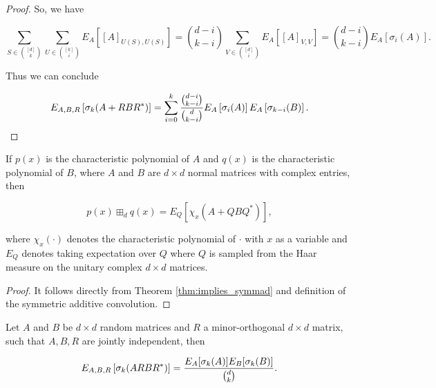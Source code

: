 \begin{proof}
    So, we have

    \begin{equation*}
        \sum_{S\in\binom{[d]}{k}} \sum_{U\in \binom{[k]}{i}}  E_A\left[ [A]_{U(S),U(S)} \right] = \binom{d-i}{k-i} \sum_{V\in \binom{[d]}{i}}  E_A\left[ [A]_{V,V} \right] = \binom{d-i}{k-i}E_A\left[\sigma_{i}(A)\right].
    \end{equation*}

    Thus we can conclude

    \begin{equation*}
        E_{A,B,R}\left[ \sigma_k(A + RBR^*) \right] =  \sum_{i=0}^k \frac{\binom{d-i}{k-i}}{\binom{d}{k-i}}E_{A} \left[\sigma_i(A)\right] E_{A}\left[\sigma_{k-i}(B)\right].
    \end{equation*}

\end{proof}


\begin{theorem} \label{thm:symmad}
    If $p(x)$ is the characteristic polynomial of $A$ and $q(x)$ is the characteristic polynomial of $B$, where $A$ and $B$ are $d\times d$ normal matrices with complex entries, then 

    \begin{equation*}
        p(x) \boxplus_d q(x) = E_Q\left[\chi_x(A + Q B Q^*)\right],
    \end{equation*}

    \noindent where $\chi_x(\cdot)$ denotes the characteristic polynomial of $\cdot$ with $x$ as a variable and $E_Q$ denotes taking expectation over $Q$ where $Q$ is sampled from the Haar measure on the unitary complex $d\times d$ matrices.
\end{theorem}

\begin{proof}
    It follows directly from Theorem \ref{thm:implies_symmad} and definition of the symmetric additive convolution.
\end{proof}



\begin{theorem} \label{thm:implies_symm_mult}
    Let $A$ and $B$ be $d\times d$ random matrices and $R$ a minor-orthogonal $d\times d$ matrix, such that $A,B,R$ are jointly independent, then

    \begin{equation*}
        E_{A,B,R} \left[\sigma_k(ARBR^*)\right] = \frac{E_A[\sigma_k(A)]E_B[\sigma_k(B)]}{\binom{d}{k}}.
    \end{equation*}
\end{theorem}

